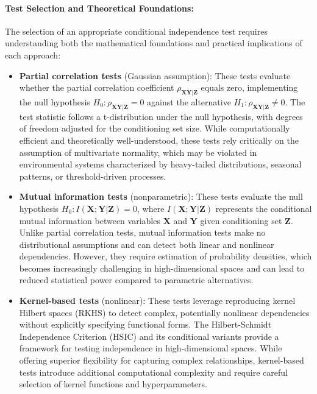 \paragraph{Test Selection and Theoretical Foundations:}

The selection of an appropriate conditional independence test requires understanding both the mathematical foundations and practical implications of each approach:

\begin{itemize}
	\item \textbf{Partial correlation tests} (Gaussian assumption): These tests evaluate whether the partial correlation coefficient $\rho_{\mathbf{X}\mathbf{Y}|\mathbf{Z}}$ equals zero, implementing the null hypothesis $H_0: \rho_{\mathbf{X}\mathbf{Y}|\mathbf{Z}} = 0$ against the alternative $H_1: \rho_{\mathbf{X}\mathbf{Y}|\mathbf{Z}} \neq 0$. The test statistic follows a t-distribution under the null hypothesis, with degrees of freedom adjusted for the conditioning set size. While computationally efficient and theoretically well-understood, these tests rely critically on the assumption of multivariate normality, which may be violated in environmental systems characterized by heavy-tailed distributions, seasonal patterns, or threshold-driven processes.

	\item \textbf{Mutual information tests} (nonparametric): These tests evaluate the null hypothesis $H_0: I(\mathbf{X};\mathbf{Y}|\mathbf{Z}) = 0$, where $I(\mathbf{X};\mathbf{Y}|\mathbf{Z})$ represents the conditional mutual information between variables $\mathbf{X}$ and $\mathbf{Y}$ given conditioning set $\mathbf{Z}$. Unlike partial correlation tests, mutual information tests make no distributional assumptions and can detect both linear and nonlinear dependencies. However, they require estimation of probability densities, which becomes increasingly challenging in high-dimensional spaces and can lead to reduced statistical power compared to parametric alternatives.

	\item \textbf{Kernel-based tests} (nonlinear): These tests leverage reproducing kernel Hilbert spaces (RKHS) to detect complex, potentially nonlinear dependencies without explicitly specifying functional forms. The Hilbert-Schmidt Independence Criterion (HSIC) and its conditional variants provide a framework for testing independence in high-dimensional spaces. While offering superior flexibility for capturing complex relationships, kernel-based tests introduce additional computational complexity and require careful selection of kernel functions and hyperparameters.
\end{itemize}

